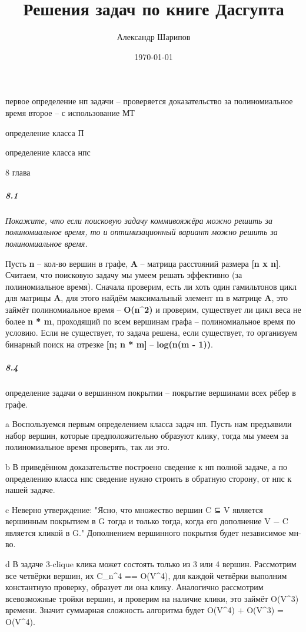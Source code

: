 \documentclass{article}
\title{Решения задач по книге Дасгупта}
\author{Александр Шарипов}
\date{\today}
\begin{document}
\maketitle
\newpage
{}

первое определение нп задачи -- проверяется доказательство за полиномиальное время
второе -- с использование МТ

определение класса П

определение класса нпс

8 глава

\subparagraph{8.1} \textit{Покажите, что если поисковую задачу коммивояжёра можно решить за полиномиальное время, то и оптимизационный вариант можно решить за полиномиальное время.}

Пусть \textbf{n} -- кол-во вершин в графе, \textbf{A} -- матрица расстояний размера \textbf{[n x n]}. Считаем, что поисковую задачу мы умеем решать эффективно (за полиномиальное время). Сначала проверим, есть ли хоть один гамильтонов цикл для матрицы \textbf{A}, для этого найдём максимальный элемент \textbf{m} в матрице \textbf{A}, это займёт полиномиальное время -- \textbf{O(n^2)} и проверим, существует ли цикл веса не более \textbf{n * m}, проходящий по всем вершинам графа -- полиномиальное время по условию. Если не существует, то задача решена, если существует, то организуем бинарный поиск на отрезке \textbf{[n; n * m]} -- \textbf{log(n(m - 1))}.

\subparagraph{8.4} определение задачи о вершинном покрытии -- покрытие вершинами всех рёбер в графе.

a
Воспользуемся первым определением класса задач нп. Пусть нам предъявили набор вершин, которые предположительно образуют клику, тогда мы умеем за полиномиальное время проверять, так ли это.

b
В приведённом доказательстве построено сведение к нп полной задаче, а по определению класса нпс сведение нужно строить в обратную сторону, от нпс к нашей задаче.

c
Неверно утверждение: "Ясно, что множество вершин C ⊆ V является вершинным покрытием в G тогда и только тогда, когда его дополнение V − C является кликой в G." Дополнением вершинного покрытия будет независимое мн-во.

d
В задаче 3-clique клика может состоять только из 3 или 4 вершин. Рассмотрим все четвёрки вершин, их C_n^4 == O(V^4), для каждой четвёрки выполним константную проверку, образует ли она клику. Аналогично рассмотрим всевозможные тройки вершин, и проверим на наличие клики, это займёт O(V^3) времени. Значит суммарная сложность алгоритма будет O(V^4) + O(V^3) = O(V^4).
\end{document}
